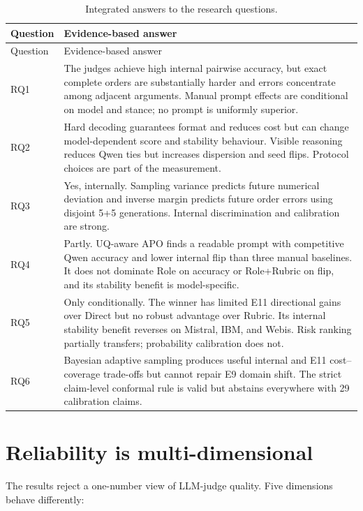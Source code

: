 \documentclass[11pt,twoside,a4paper]{report}
\begin{document}
\begin{longtable}{@{}p{}p{}@{}}
\caption{Integrated answers to the research questions.}\label{tab:rq-answers}\\
\toprule
Question & Evidence-based answer \\
\midrule
\endfirsthead
\toprule
Question & Evidence-based answer \\
\midrule
\endhead
RQ1 &
The judges achieve high internal pairwise accuracy, but exact complete orders are
substantially harder and errors concentrate among adjacent arguments.  Manual prompt
effects are conditional on model and stance; no prompt is uniformly superior. \\
RQ2 &
Hard decoding guarantees format and reduces cost but can change model-dependent
score and stability behaviour.  Visible reasoning reduces Qwen ties but increases
dispersion and seed flips.  Protocol choices are part of the measurement. \\
RQ3 &
Yes, internally.  Sampling variance predicts future numerical deviation and inverse
margin predicts future order errors using disjoint 5+5 generations.  Internal
discrimination and calibration are strong. \\
RQ4 &
Partly.  UQ-aware APO finds a readable prompt with competitive Qwen accuracy and
lower internal flip than three manual baselines.  It does not dominate Role on
accuracy or Role+Rubric on flip, and its stability benefit is model-specific. \\
RQ5 &
Only conditionally.  The winner has limited E11 directional gains over Direct but no
robust advantage over Rubric.  Its internal stability benefit reverses on Mistral,
IBM, and Webis.  Risk ranking partially transfers; probability calibration does not. \\
RQ6 &
Bayesian adaptive sampling produces useful internal and E11 cost--coverage trade-offs
but cannot repair E9 domain shift.  The strict claim-level conformal rule is valid but
abstains everywhere with 29 calibration claims. \\
\bottomrule
\end{longtable}

\section{Reliability is multi-dimensional}

The results reject a one-number view of LLM-judge quality.  Five dimensions behave
differently:
\end{document}
